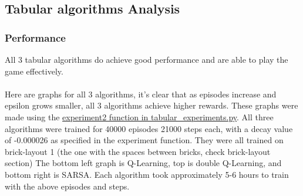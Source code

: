 \documentclass[twoside,11pt]{article}
\begin{document}
\subsection{Tabular algorithms Analysis} 
\subsubsection{Performance}
All 3 tabular algorithms do achieve good performance and are able to play the game effectively.
\\\\
Here are graphs for all 3 algorithms, it's clear that as episodes increase and epsilon grows smaller, all 3 algorithms achieve higher rewards. These graphs were made using the \href{https://github.com/duoduocai-dot/csc498-project/blob/main/tabular_experiments.py#L125}{experiment2 function in tabular\_experiments.py}. All three algorithms were trained for 40000 episodes 21000 steps each, with a decay value of -0.000026 as specified in the experiment function. They were all trained on brick-layout 1 (the one with the spaces between bricks, check brick-layout section) The bottom left graph is Q-Learning, top is double Q-Learning, and bottom right is SARSA. Each algorithm took approximately 5-6 hours to train with the above episodes and steps.
\end{document}
